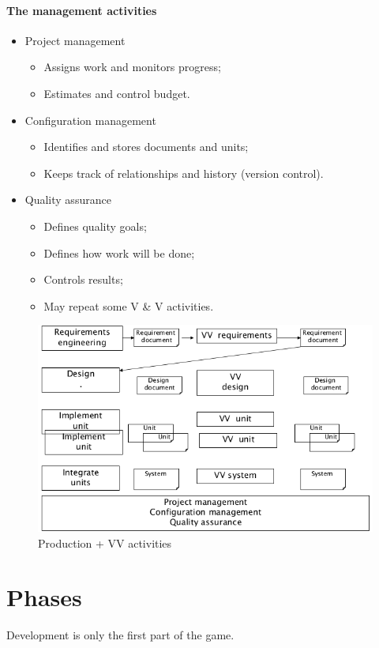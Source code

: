 \paragraph{The management activities}
\begin{itemize}
\item Project management
\begin{itemize}
\item Assigns work and monitors progress;
\item Estimates and control budget.
\end{itemize}
\item Configuration management
\begin{itemize}
\item Identifies and stores documents and units;
\item Keeps track of relationships and history (version control).
\end{itemize}
\item Quality assurance
\begin{itemize}
\item Defines quality goals;
\item Defines how work will be done;
\item Controls results;
\item May repeat some V \& V activities.
\end{itemize}
\end{itemize}

\begin{figure}[hbtp]
\centering
\includegraphics[scale=0.5]{images/software_activities.png}
\caption{Production + VV activities}
\end{figure}

\section{Phases}
Development is only the first part of the game. 

